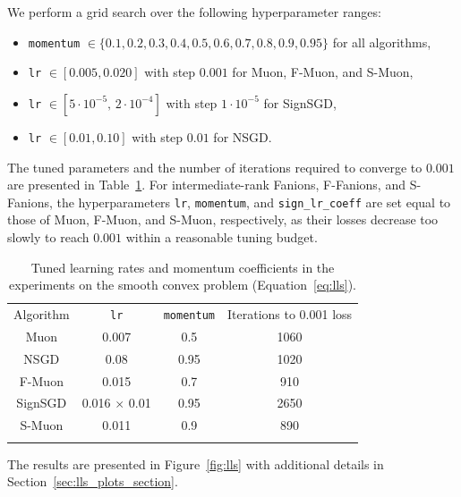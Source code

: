 \documentclass[a4paper,14pt,oneside]{extarticle}
\newcommand{\sectionref}[1]{Section~\ref{#1}}
\newcommand{\figureref}[1]{Figure~\ref{#1}}
\newcommand{\tableref}[1]{Table~\ref{#1}}
\newcommand{\equationref}[1]{Equation~\ref{#1}}
\begin{document}
We perform a grid search over the following hyperparameter ranges:
\begin{itemize}
  \item \texttt{momentum} $\in \{0.1, 0.2, 0.3, 0.4, 0.5, 0.6, 0.7, 0.8, 0.9, 0.95\}$ for all algorithms,
  \item \texttt{lr} $\in [0.005, 0.020]$ with step $0.001$ for Muon, F-Muon, and S-Muon,
  \item \texttt{lr} $\in [5 \cdot 10^{-5},\, 2 \cdot 10^{-4}]$ with step $1 \cdot 10^{-5}$ for SignSGD,
  \item \texttt{lr} $\in [0.01, 0.10]$ with step $0.01$ for NSGD.
\end{itemize}
The tuned parameters and the number of iterations required to converge to $0.001$ are presented in \tableref{tbl:lls_lrs}. For intermediate-rank Fanions, F-Fanions, and S-Fanions, the hyperparameters \texttt{lr}, \texttt{momentum}, and \texttt{sign\_lr\_coeff} are set equal to those of Muon, F-Muon, and S-Muon, respectively, as their losses decrease too slowly to reach $0.001$ within a reasonable tuning budget.

\begin{table}[htbp]
  \centering
  \caption{Tuned learning rates and momentum coefficients in the experiments on the smooth convex problem (\equationref{eq:lls}).}
  \label{tbl:lls_lrs}
  \begin{tabular}{cccc}
    \arrayrulecolor{black}\toprule
    Algorithm & \texttt{lr}  & \texttt{momentum}  & Iterations to 0.001 loss \\
    \arrayrulecolor{black}\hline
    Muon & 0.007 & 0.5 & 1060 \\
    \hdashline
    NSGD & 0.08 & 0.95 & 1020 \\
    F-Muon & 0.015 & 0.7 & 910 \\
    \hdashline
    SignSGD & 0.016 $\times$ 0.01 & 0.95 & 2650 \\
    S-Muon & 0.011 & 0.9 & 890 \\
    \arrayrulecolor{black}\bottomrule
  \end{tabular}
\end{table}

The results are presented in \figureref{fig:lls} with additional details in \sectionref{sec:lls_plots_section}.
\end{document}
